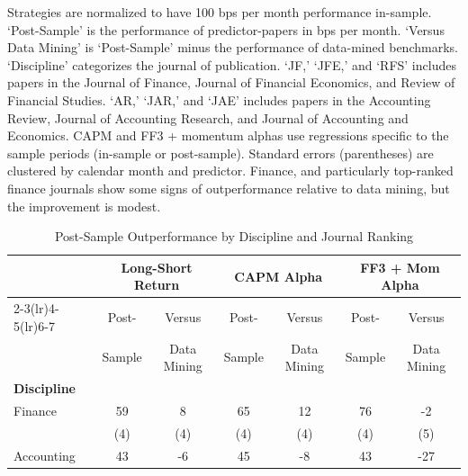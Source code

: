 \begin{table}[!h]
   \caption{Post-Sample Outperformance by Discipline and Journal Ranking}
   \label{tab:hetero-byjournal}
   
   \begin{singlespace}
   \noindent Strategies are normalized to have 100 bps per month performance in-sample. `Post-Sample' is the performance of predictor-papers in bps per month. `Versus Data Mining' is `Post-Sample' minus the performance of data-mined benchmarks. `Discipline' categorizes the journal of publication. `JF,' `JFE,' and `RFS' includes papers in the Journal of Finance, Journal of Financial Economics, and Review of Financial Studies. `AR,' `JAR,' and `JAE' includes papers in the Accounting Review, Journal of Accounting Research, and Journal of Accounting and Economics. CAPM and FF3 + momentum alphas use regressions specific to the sample periods (in-sample or post-sample). Standard errors (parentheses) are clustered by calendar month and predictor. Finance, and particularly top-ranked finance journals show some signs of outperformance relative to data mining, but the improvement is modest. 
   \end{singlespace}
   \begin{centering}
   \vspace{0ex}
   \par\end{centering}
   \centering{}\setlength{\tabcolsep}{1.2ex} \small
   \begin{center}
   \begin{tabular}{lcccccc}
      \toprule
      & \multicolumn{2}{c}{Long-Short Return} & \multicolumn{2}{c}{CAPM Alpha} & \multicolumn{2}{c}{FF3 + Mom Alpha} \\
      \cmidrule(lr){2-3}\cmidrule(lr){4-5}\cmidrule(lr){6-7}
      & Post- & \multicolumn{1}{c}{Versus} & Post- & \multicolumn{1}{c}{Versus} & Post- & \multicolumn{1}{c}{Versus} \\
      & Sample & \multicolumn{1}{c}{Data Mining} & Sample & \multicolumn{1}{c}{Data Mining} & Sample & \multicolumn{1}{c}{Data Mining} \\
      \midrule
      \multicolumn{7}{l}{\textbf{Discipline}} \\
      Finance      & 59 & 8 & 65 & 12 & 76 & -2 \\
                   & (4) & (4) & (4) & (4) & (4) & (5) \\
      Accounting   & 43 & -6 & 45 & -8 & 43 & -27 \\

\end{tabular}
\end{center}
\end{table}

